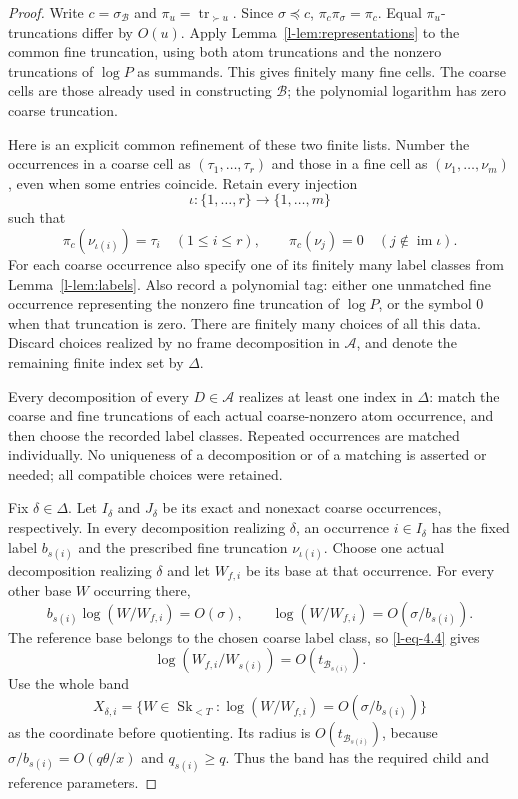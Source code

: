 \documentclass[11pt]{article}
\theoremstyle{definition}
\theoremstyle{remark}
\newcommand{\Sk}{\operatorname{Sk}}
\newcommand{\tr}{\operatorname{tr}}
\newcommand{\calB}{\mathcal B}
\newcommand{\calA}{\mathcal A}
\numberwithin{equation}{section}
\begin{document}
\begin{proof}
Write $c=\sigma_{\calB}$ and
$\pi_u=\tr_{\succ u}$.  Since $\sigma\preceq c$,
$\pi_c\pi_\sigma=\pi_c$.  Equal $\pi_u$-truncations differ by
$O(u)$.  Apply Lemma~\ref{l-lem:representations} to the common
fine truncation, using both atom truncations and the nonzero
truncations of $\log P$ as summands.  This gives finitely many
fine cells.  The coarse cells are those already used in constructing
$\calB$; the polynomial logarithm has zero coarse truncation.

Here is an explicit common refinement of these two finite lists.
Number the occurrences in a coarse cell as
$(\tau_1,\ldots,\tau_r)$ and those in a fine cell as
$(\nu_1,\ldots,\nu_m)$, even when some entries coincide.
Retain every injection
\[
 \iota:\{1,\ldots,r\}\longrightarrow\{1,\ldots,m\}
\]
such that
\[
 \pi_c(\nu_{\iota(i)})=\tau_i\quad(1\le i\le r),
 \qquad
 \pi_c(\nu_j)=0\quad(j\notin\operatorname{im}\iota).
\]
For each coarse occurrence also specify one of its finitely many
label classes from Lemma~\ref{l-lem:labels}.  Also record a
polynomial tag: either one unmatched fine occurrence representing
the nonzero fine truncation of $\log P$, or the symbol $0$ when
that truncation is zero.  There are finitely
many choices of all this data.  Discard choices realized by no
frame decomposition in $\calA$, and denote the remaining finite
index set by $\Delta$.

Every decomposition of every $D\in\calA$ realizes at least one
index in $\Delta$: match the coarse and fine truncations of each
actual coarse-nonzero atom occurrence, and then choose the recorded
label classes.  Repeated occurrences are matched individually.
No uniqueness of a decomposition or of a matching is asserted or
needed; all compatible choices were retained.

Fix $\delta\in\Delta$.  Let $I_\delta$ and $J_\delta$ be its
exact and nonexact coarse occurrences, respectively.  In every
decomposition realizing $\delta$, an occurrence $i\in I_\delta$
has the fixed label $b_{s(i)}$ and the prescribed fine truncation
$\nu_{\iota(i)}$.  Choose one actual decomposition realizing
$\delta$ and let $W_{f,i}$ be its base at that occurrence.
For every other base $W$ occurring there,
\[
 b_{s(i)}\log(W/W_{f,i})=O(\sigma),
 \qquad
 \log(W/W_{f,i})=O(\sigma/b_{s(i)}).
\]
The reference base belongs to the chosen coarse label class, so
\eqref{l-eq-4.4} gives
\[
 \log(W_{f,i}/W_{s(i)})=O(t_{\calB_{s(i)}}).
\]
Use the whole band
\[
 X_{\delta,i}=
 \{W\in\Sk_{<T}:\log(W/W_{f,i})=O(\sigma/b_{s(i)})\}
\]
as the coordinate before quotienting.  Its radius is
$O(t_{\calB_{s(i)}})$, because
$\sigma/b_{s(i)}=O(q\theta/x)$ and $q_{s(i)}\ge q$.
Thus the band has the required child and reference parameters.


\end{proof}
\end{document}
